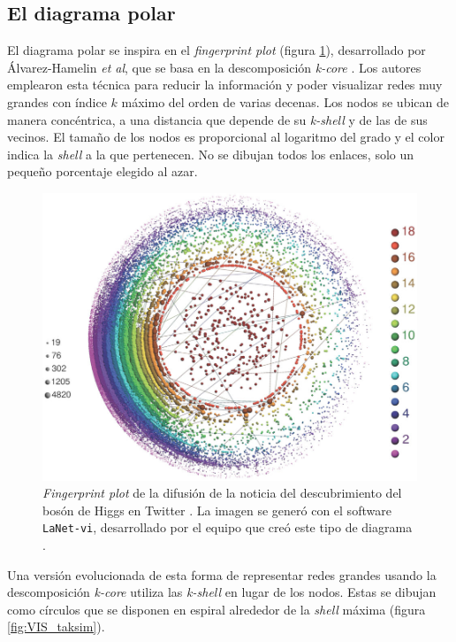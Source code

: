 \subsection{El diagrama polar}

El diagrama polar se inspira en el \textit{fingerprint plot} (figura \ref{fig:fingerprint_plot}), desarrollado por Álvarez-Hamelin \textit{et al}, que se basa en la descomposición \textit{k-core} \cite{alvarez2005k}. Los autores emplearon esta técnica para reducir la información y poder visualizar redes muy grandes con índice $k$ máximo del orden de varias decenas. Los nodos se ubican de manera concéntrica, a una distancia que depende de su \textit{k-shell} y de las de sus vecinos. El tamaño de los nodos es proporcional al logaritmo del grado y el color indica la \textit{shell} a la que pertenecen. No se dibujan todos los enlaces, solo un pequeño porcentaje elegido al azar.

\begin{figure}[h!]
\centering
\includegraphics[scale=0.5]{Figures/VIS_fingerprint_plot.png}
\caption{\textit{Fingerprint plot} de la difusión de la noticia del descubrimiento del bosón de Higgs en Twitter \cite{de2013anatomy}. La imagen se generó con el software \texttt{LaNet-vi}, desarrollado por el equipo que creó este tipo de diagrama \cite{alvarez2008low}.}
\label{fig:fingerprint_plot}
\end{figure}

Una versión evolucionada de esta forma de representar redes grandes usando la descomposición \textit{k-core} utiliza las \textit{k-shell} en lugar de los nodos. Estas se dibujan como círculos que se disponen en espiral alrededor de la \textit{shell} máxima (figura \ref{fig:VIS_taksim}).

